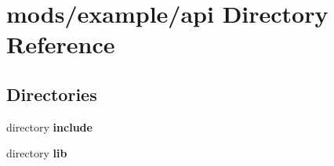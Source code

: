 \section{mods/example/api Directory Reference}
\label{dir_827b23dc8a2ba9e8f4242c1c24c8a245}
\subsection*{Directories}
\begin{DoxyCompactItemize}
\item 
directory {\bf include}
\item 
directory {\bf lib}
\end{DoxyCompactItemize}
